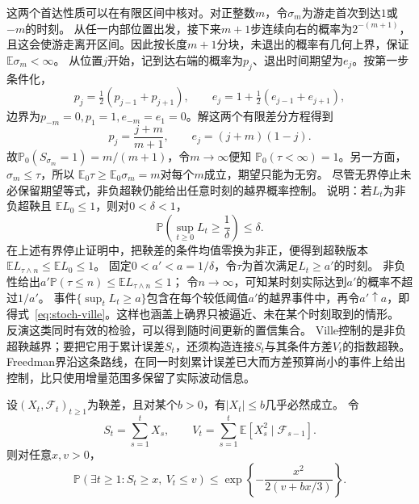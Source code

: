 这两个首达性质可以在有限区间中核对。对正整数\(m\)，令\(\sigma_m\)为游走首次到达\(1\)或\(-m\)的时刻。
从任一内部位置出发，接下来\(m+1\)步连续向右的概率为\(2^{-(m+1)}\)，且这会使游走离开区间。因此按长度\(m+1\)分块，未退出的概率有几何上界，保证\(\mathbb E\sigma_m<\infty\)。
从位置\(j\)开始，记到达右端的概率为\(p_j\)、退出时间期望为\(e_j\)。按第一步条件化，
\[
 p_j=\tfrac12(p_{j-1}+p_{j+1}),\qquad
 e_j=1+\tfrac12(e_{j-1}+e_{j+1}),
\]
边界为\(p_{-m}=0,p_1=1,e_{-m}=e_1=0\)。解这两个有限差分方程得到
\[
 p_j=\frac{j+m}{m+1},\qquad e_j=(j+m)(1-j).
\]
故\(\mathbb P_0(S_{\sigma_m}=1)=m/(m+1)\)，令\(m\to\infty\)便知
\(\mathbb P_0(\tau<\infty)=1\)。另一方面，\(\sigma_m\leq\tau\)，所以
\(\mathbb E_0\tau\geq\mathbb E_0\sigma_m=m\)对每个\(m\)成立，期望只能为无穷。
尽管无界停止未必保留期望等式，非负超鞅仍能给出任意时刻的越界概率控制。
说明：若$L_t$为非负超鞅且
$\mathbb{E}L_0\leq1$，则对\(0<\delta<1\)，
\begin{equation}
  \mathbb{P}\left(\sup_{t\geq0}L_t\geq\frac1\delta\right)
  \leq\delta.
  \label{eq:stoch-ville}
\end{equation}
在上述有界停止证明中，把鞅差的条件均值零换为非正，便得到超鞅版本
\(\mathbb E L_{\tau\wedge n}\leq\mathbb E L_0\leq1\)。
固定\(0<a'<a=1/\delta\)，令\(\tau\)为首次满足\(L_t\geq a'\)的时刻。
非负性给出\(a'\mathbb P(\tau\leq n)\leq\mathbb E L_{\tau\wedge n}\leq1\)；
令\(n\to\infty\)，可知某时刻实际达到\(a'\)的概率不超过\(1/a'\)。
事件\(\{\sup_tL_t\geq a\}\)包含在每个较低阈值\(a'\)的越界事件中，再令\(a'\uparrow a\)，即得式~\eqref{eq:stoch-ville}。这样也涵盖上确界只被逼近、未在某个时刻取到的情形。
反演这类同时有效的检验，可以得到随时间更新的置信集合。
Ville控制的是非负超鞅越界；要把它用于累计误差\(S_t\)，还须构造连接\(S_t\)与其条件方差\(V_t\)的指数超鞅。Freedman界沿这条路线，在同一时刻累计误差已大而方差预算尚小的事件上给出控制，比只使用增量范围多保留了实际波动信息。
\begin{theorem}[标量Freedman不等式]
  \label{thm:stoch-freedman}
  设$(X_t,\mathcal{F}_t)_{t\geq1}$为鞅差，且对某个$b>0$，有$|X_t|\leq b$几乎必然成立。
  令
  \[
    S_t=\sum_{s=1}^{t}X_s,\qquad
    V_t=\sum_{s=1}^{t}
      \mathbb{E}[X_s^2\mid\mathcal{F}_{s-1}].
  \]
  则对任意$x,v>0$，
  \begin{equation}
    \mathbb{P}\left(\exists t\geq1:S_t\geq x,\ V_t\leq v\right)
    \leq\exp\left\{
      -\frac{x^2}{2(v+bx/3)}
    \right\}.
    \label{eq:stoch-freedman}
  \end{equation}
\end{theorem}


